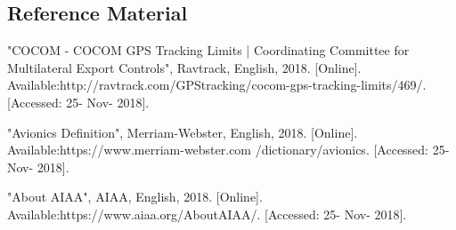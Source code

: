 \documentclass[journal,10pt,onecolumn,compsoc]{IEEEtran}
\begin{document}
	\subsection{Reference Material}
		\noindent [1]"COCOM - COCOM GPS Tracking Limits | Coordinating Committee for Multilateral Export Controls", Ravtrack, English, 2018. [Online]. Available:http://ravtrack.com/GPStracking/cocom-gps-tracking-limits/469/. [Accessed: 25- Nov- 2018].
		
		\noindent [2]"Avionics Definition", Merriam-Webster, English, 2018. [Online]. Available:https://www.merriam-webster.com
		\noindent /dictionary/avionics. [Accessed: 25- Nov- 2018].
		
		\noindent [3]"About AIAA", AIAA, English, 2018. [Online]. Available:https://www.aiaa.org/AboutAIAA/. [Accessed: 25- Nov- 2018].
\end{document}
